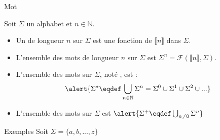 
\begingroup

\begin{frame}{Mot}

  Soit $\Sigma$ un alphabet et $n\in \mathbb{N}$.
  \begin{itemize}
  \item Un  de longueur $n$ sur $\Sigma$ est une \alert{fonction de $\llbracket n\rrbracket$ dans $\Sigma$}.
  \item L'ensemble des mots de longueur $n$ sur $\Sigma$ est \alert{$\Sigma^n = \mathscr{F}(\llbracket n\rrbracket, \Sigma)$}.
  \item L'ensemble des mots sur $\Sigma$, noté \structure{$\Sigma^\star$}, est :
    $$\alert{\displaystyle \Sigma^\star \eqdef \bigcup_{n\in \mathbb{N}} \Sigma^n = \Sigma^0 \cup \Sigma^1 \cup \Sigma^2 \cup ...}$$
  \item L'ensemble des mots  sur $\Sigma$ est
    $\alert{\Sigma^+ \eqdef \bigcup_{n \neq 0 } \Sigma^n}$
  \end{itemize}

  \begin{exampleblock}{Exemples}
    Soit $\Sigma = \{a, b, ..., z\}$


\end{exampleblock}
\end{frame}

